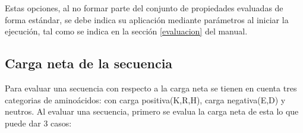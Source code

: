 Estas opciones, al no formar parte del conjunto de propiedades evaluadas de forma estándar, se debe indica su aplicación mediante parámetros al iniciar la ejecución, tal como se indica en la sección \ref{evaluacion} del manual.

\subsection{Carga neta de la secuencia}


Para evaluar una secuencia con respecto a la carga neta se tienen en cuenta tres categorias de aminoácidos: con carga positiva(K,R,H), carga negativa(E,D) y neutros.
Al evaluar una secuencia, primero se evalua la carga neta de esta lo que puede dar 3 casos:

